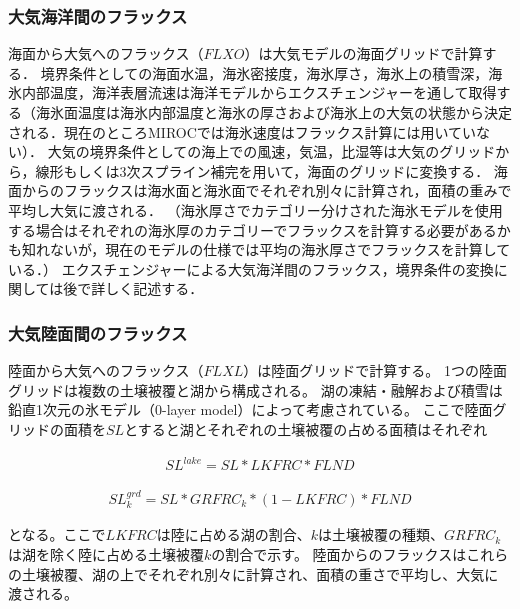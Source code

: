 \hypertarget{ux5927ux6c17ux6d77ux6d0bux9593ux306eux30d5ux30e9ux30c3ux30afux30b9}{%
\subsubsection{大気海洋間のフラックス}\label{ux5927ux6c17ux6d77ux6d0bux9593ux306eux30d5ux30e9ux30c3ux30afux30b9}}

海面から大気へのフラックス（\(FLXO\)）は大気モデルの海面グリッドで計算する．
境界条件としての海面水温，海氷密接度，海氷厚さ，海氷上の積雪深，海氷内部温度，海洋表層流速は海洋モデルからエクスチェンジャーを通して取得する（海氷面温度は海氷内部温度と海氷の厚さおよび海氷上の大気の状態から決定される．現在のところMIROCでは海氷速度はフラックス計算には用いていない）．
大気の境界条件としての海上での風速，気温，比湿等は大気のグリッドから，線形もしくは3次スプライン補完を用いて，海面のグリッドに変換する．
海面からのフラックスは海水面と海氷面でそれぞれ別々に計算され，面積の重みで平均し大気に渡される．
（海氷厚さでカテゴリー分けされた海氷モデルを使用する場合はそれぞれの海氷厚のカテゴリーでフラックスを計算する必要があるかも知れないが，現在のモデルの仕様では平均の海氷厚さでフラックスを計算している．）
エクスチェンジャーによる大気海洋間のフラックス，境界条件の変換に関しては後で詳しく記述する．

\hypertarget{ux5927ux6c17ux9678ux9762ux9593ux306eux30d5ux30e9ux30c3ux30afux30b9}{%
\subsubsection{大気陸面間のフラックス}\label{ux5927ux6c17ux9678ux9762ux9593ux306eux30d5ux30e9ux30c3ux30afux30b9}}

陸面から大気へのフラックス（\(FLXL\)）は陸面グリッドで計算する。
1つの陸面グリッドは複数の土壌被覆と湖から構成される。
湖の凍結・融解および積雪は鉛直1次元の氷モデル（0-layer
model）によって考慮されている。
ここで陸面グリッドの面積を\(SL\)とすると湖とそれぞれの土壌被覆の占める面積はそれぞれ

\begin{eqnarray} SL^{lake}=SL * LKFRC * FLND \end{eqnarray}

\begin{eqnarray} SL^{grd}_k = SL * GRFRC_k * (1-LKFRC) * FLND \end{eqnarray}

となる。ここで\(LKFRC\)は陸に占める湖の割合、\(k\)は土壌被覆の種類、\(GRFRC_k\)は湖を除く陸に占める土壌被覆\(k\)の割合で示す。
陸面からのフラックスはこれらの土壌被覆、湖の上でそれぞれ別々に計算され、面積の重さで平均し、大気に渡される。

